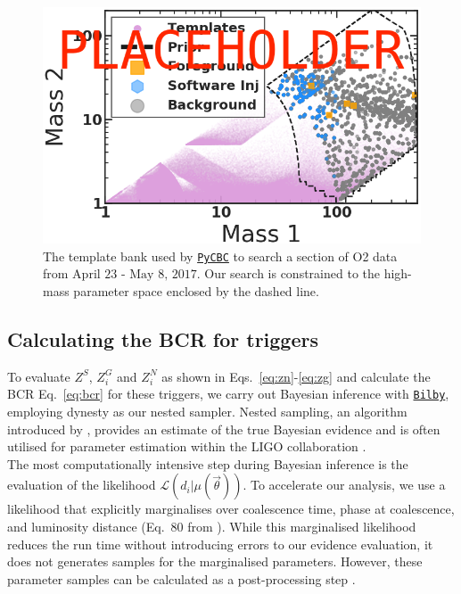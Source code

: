 \documentclass[%
preprint,
 amsmath,amssymb,
 aps,
]{revtex4}
\newcommand{\bilby}{{\sc \href{https://lscsoft.docs.ligo.org/bilby/}{\texttt{Bilby}}}\xspace}
\newcommand{\dynesty}{{\sc dynesty}\xspace}
\newcommand{\pycbc}{{\sc \href{https://pycbc.org/}{\texttt{PyCBC}}}\xspace}
\newcommand{\bcr}{{\sc BCR}\xspace}
\begin{document}
\begin{figure}[!h]

{\centering \includegraphics[width=0.75\linewidth]{images/template_bank_masses} 

}
\caption[High-mass BCR search space.]{The template bank used by \pycbc to search a section of O2 data from $\text{April 23 - May 8, 2017}$. Our search is constrained to the high-mass parameter space enclosed by the dashed line.}\label{fig:templateBank}
\end{figure}


\subsection{Calculating the BCR for triggers}
To evaluate $Z^S$, $Z^G_i$ and $Z^N_i$ as shown in Eqs.~\ref{eq:zn}-\ref{eq:zg} and calculate the \bcr Eq.~\ref{eq:bcr} for these triggers, we carry out Bayesian inference with \bilby \cite{bilby}, employing \dynesty \cite{dynesty} as our nested sampler. Nested sampling, an algorithm introduced by \cite{skilling_nested_sampling}, provides an estimate of the true Bayesian evidence and is often utilised for parameter estimation within the LIGO collaboration \cite{bilby}.\\ 

The most computationally intensive step during Bayesian inference is the evaluation of the likelihood $\mathcal{L}(d_i|\mu(\vec{\theta}))$. To accelerate our analysis, we use a likelihood that explicitly marginalises over coalescence time, phase at coalescence, and luminosity distance (Eq.~80 from \citet{intro_to_gw_bayes}). While this marginalised likelihood reduces the run time without introducing errors to our evidence evaluation, it does not generates samples for the marginalised parameters. However, these parameter samples can be calculated as a post-processing step \cite{intro_to_gw_bayes}.\\
\end{document}
